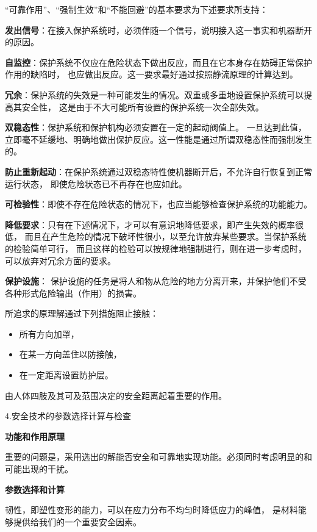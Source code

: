 \documentclass[letterpaper,10pt,english]{sphinxmanual}
\begin{document}
“可靠作用”、“强制生效”和“不能回避”的基本要求为下述要求所支持：

\textbf{发出信号}：在接入保护系统时，必须伴随一个信号，说明接入这一事实和机器断开的原因。

\textbf{自监控}：保护系统不仅应在危险状态下做出反应，而且在它本身存在妨碍正常保护作用的缺陷时，
也应做出反应。这一要求最好通过按照静流原理的计算达到。

\textbf{冗余}：保护系统的失效是一种可能发生的情况。双重或多重地设置保护系统可以提高其安全性，
这是由于不大可能所有设置的保护系统一次全部失效。

\textbf{双稳态性}：保护系统和保护机构必须安置在一定的起动阀值上。
一旦达到此值，立即毫不延缓地、明确地做出保护反应。这一性能是通过所谓双稳态性而强制发生的。

\textbf{防止重新起动}：在保护系统通过双稳态特性使机器断开后，不允许自行恢复到正常运行状态，
即使危险状态已不再存在也应如此。

\textbf{可检验性}：即使不存在危险状态的情况下，也应当能够检查保护系统的功能能力。

\textbf{降低要求}：只有在下述情况下，才可以有意识地降低要求，即产生失效的概率很低，
而且在产生危险的情况下破坏性很小，以至允许放弃某些要求。当保护系统的检验简单可行，
而且这样的检验可以按规律地强制进行，则在进一步考虑时，可以放弃对冗余方面的要求。

\textbf{保护设施}：
保护设施的任务是将人和物从危险的地方分离开来，并保护他们不受各种形式危险输出（作用）的损害。

所追求的原理解通过下列措施阻止接触：
\begin{itemize}
\item {} 
所有方向加罩，

\item {} 
在某一方向盖住以防接触，

\item {} 
在一定距离设置防护层。

\end{itemize}

由人体四肢及其可及范围决定的安全距离起着重要的作用。

4.安全技术的参数选择计算与检查

\textbf{功能和作用原理}

重要的问题是，采用选出的解能否安全和可靠地实现功能。必须同时考虑明显的和可能出现的干扰。

\textbf{参数选择和计算}

韧性，即塑性变形的能力，可以在应力分布不均匀时降低应力的峰值，
是材料能够提供给我们的一个重要安全因素。
\end{document}
